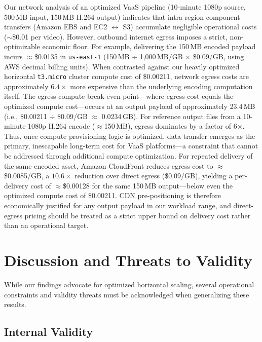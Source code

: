 \documentclass[conference]{IEEEtran}
\begin{document}
Our network analysis of an optimized VaaS pipeline (10-minute 1080p source, 500\,MB input, 150\,MB H.264 output) indicates that intra-region component transfers (Amazon EBS and EC2 $\leftrightarrow$ S3) accumulate negligible operational costs ($\sim$\$0.01 per video). However, outbound internet egress imposes a strict, non-optimizable economic floor. For example, delivering the 150\,MB encoded payload incurs $\approx$\$0.0135 in \texttt{us-east-1} (150\,MB $\div$ 1{,}000\,MB/GB $\times$ \$0.09/GB, using AWS decimal billing units). When contrasted against our heavily optimized horizontal \texttt{t3.micro} cluster compute cost of \$0.00211, network egress costs are approximately $6.4\times$ more expensive than the underlying encoding computation itself. The egress-compute break-even point---where egress cost equals the optimized compute cost---occurs at an output payload of approximately 23.4\,MB (i.e., \$0.00211 $\div$ \$0.09/GB $\approx$ 0.0234\,GB). For reference output files from a 10-minute 1080p H.264 encode ($\approx$150\,MB), egress dominates by a factor of 6$\times$. Thus, once compute provisioning logic is optimized, data transfer emerges as the primary, inescapable long-term cost for VaaS platforms---a constraint that cannot be addressed through additional compute optimization. For repeated delivery of the same encoded asset, Amazon CloudFront reduces egress cost to $\approx$\$0.0085/GB, a $10.6\times$ reduction over direct egress (\$0.09/GB), yielding a per-delivery cost of $\approx$\$0.00128 for the same 150\,MB output---below even the optimized compute cost of \$0.00211. CDN pre-positioning is therefore economically justified for any output payload in our workload range, and direct-egress pricing should be treated as a strict upper bound on delivery cost rather than an operational target.

\section{Discussion and Threats to Validity}
\label{limitations}

While our findings advocate for optimized horizontal scaling, several
operational constraints and validity threats must be acknowledged when
generalizing these results.

\subsection{Internal Validity}
\end{document}
